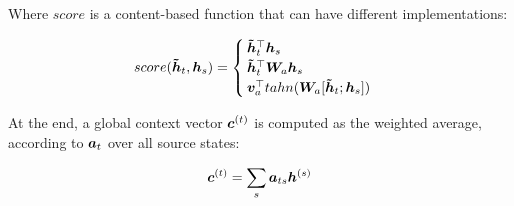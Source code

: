 Where $score$ is a content-based function that can have different implementations: 

\begin{equation}
score(\bm{\tilde{h}}_t,\bm{h}_s) = \begin{cases}
\bm{\tilde{h}}_t ^{\top}\bm{h}_s\\
\bm{\tilde{h}}_t ^{\top}\bm{W}_a \bm{h}_s\\
\bm{v}_a ^{\top}tahn(\bm{W}_a[\bm{\tilde{h}}_t;\bm{h}_s])\\
\end{cases}
\end{equation}

At the end, a global context vector $\bm{c}^{(t)}$ is computed as the weighted average, according to $\bm{a}_t$ over all source states:

\begin{equation}
\bm{c}^{(t)} = \sum_{s} \bm{a}_{ts}\bm{h}^{(s)}
\end{equation}



